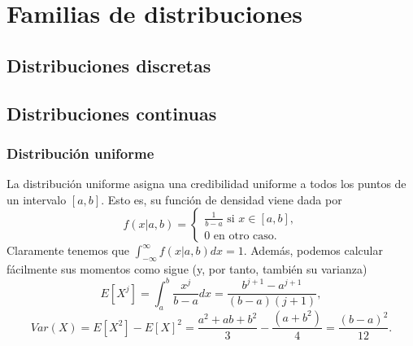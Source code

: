 \documentclass{article}
\begin{document}
\hypersetup{pageanchor=false}
\maketitle
\hypersetup{pageanchor=true}



\newpage
\tableofcontents
\vspace*{\fill}
\doclicenseThis
\newpage


\section{Familias de distribuciones}

\subsection{Distribuciones discretas}

\subsection{Distribuciones continuas}

\subsubsection{Distribución uniforme}

La distribución uniforme asigna una credibilidad uniforme a todos los puntos de un intervalo $[a,b]$. Esto es, su función de densidad viene dada por
\[f(x|a,b) = \begin{cases}\frac{1}{b-a} \text{ si } x \in [a,b], \\ 0 \text{ en otro caso.}\end{cases}\]
Claramente tenemos que $\int_{-\infty}^{\infty} f(x |a,b) dx = 1$. Además, podemos calcular fácilmente sus momentos como sigue (y, por tanto, también su varianza)
\[E[X^j] = \int_a^b \frac{x^j}{b-a} dx = \frac{b^{j+1} - a^{j+1}}{(b-a) (j+1)},\]
\[Var(X) = E[X^2] - E[X]^2 = \frac{a^2 + ab + b^2}{3} - \frac{(a+b^2)}{4} = \frac{(b-a)^2}{12}.\]
\end{document}
